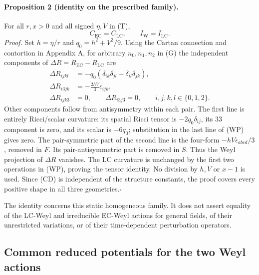 \paragraph{Proposition 2 (identity on the prescribed family).}
For all $r,x>0$ and all signed $\eta,V$ in (T),
\begin{equation}
C_{\mathrm{EC}}=C_{\mathrm{LC}},\qquad I_{\mathrm{W}}=I_{\mathrm{LC}}.
\tag{ID}\label{eq:ID}
\end{equation}
\emph{Proof.} Set $h=\eta/r$ and $q_0=h^2+V^2/9$.
Using the Cartan connection and contortion in Appendix A, for arbitrary
$n_0,n_1,n_2$ in (G) the independent components of
$\Delta R=R_{\mathrm{EC}}-R_{\mathrm{LC}}$ are
\begin{equation}
\begin{aligned}
\Delta R_{ijkl}&=-q_0(\delta_{ik}\delta_{jl}-\delta_{il}\delta_{jk}),\\
\Delta R_{i3jk}&=-\tfrac{2hV}{3}\epsilon_{ijk},\\
\Delta R_{ijk3}&=0,\qquad\Delta R_{i3j3}=0,
\qquad i,j,k,l\in\{0,1,2\}.
\end{aligned}\tag{CD}\label{eq:CD}
\end{equation}
Other components follow from antisymmetry within each pair. The first line
is entirely Ricci/scalar curvature: its spatial Ricci tensor is
$-2q_0\delta_{ij}$, its $33$ component is zero, and its scalar is $-6q_0$;
substitution in the last line of (WP) gives zero. The pair-symmetric part
of the second line is the four-form $-hV\epsilon_{abcd}/3$, removed in $F$.
Its pair-antisymmetric part is removed in $S$. Thus the Weyl projection of
$\Delta R$ vanishes. The LC curvature is unchanged by the first two
operations in (WP), proving the tensor identity. No division by $h,V$ or
$x-1$ is used. Since (CD) is independent of the structure constants, the
proof covers every positive shape in all three geometries.\hfill$\square$

The identity concerns this static homogeneous family. It does not assert
equality of the LC-Weyl and irreducible EC-Weyl actions for general fields, of their unrestricted
variations, or of their time-dependent perturbation operators.

\subsection{Common reduced potentials for the two Weyl actions}

